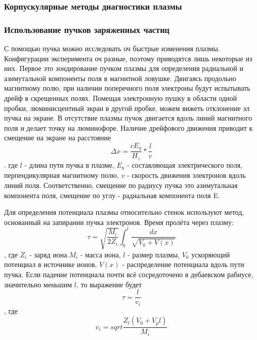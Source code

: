 \documentclass[10pt, a4paper]{article}
\begin{document}
\subsubsection{Корпускулярные методы диагностики плазмы}
\label{11.6}

\subsubsection{Использование пучков заряженных частиц}
\label{11.6.1}
С помощью пучка можно исследовать оч быстрые изменения плазмы. Конфигурации эксперимента оч разные, поэтому приводятся лишь некоторые из них.
Первое это зондирование пучком плазмы для определения радиальной и азимутальной компоненты поля в магнитной ловушке. Двигаясь продольно магнитному полю, при наличии поперечного поля электроны будут испытывать дрейф в скрещенных полях. Помещая электронную пушку в области одной пробки, люминисцентный экран в другой пробке, можем вижеть отклонение эл пучка на экране.
В отсутствие плазмы пучок двигается вдоль линий магнитного поля и делает точку на люминофоре. Наличие дрейфового движения приводит к смещение на экране на расстояние
\begin{equation}
	\Delta x=\frac{cE_y}{H_z} * \frac{l}{v}
\end{equation}
. где $l$ - длина пути пучка в плазме, $E_y$ - составляющая электрического поля, перпендикулярная магнитному полю, $v$ - скорость движения электронов вдоль линий поля.
Соответственно, смещение по радиусу пучка это азимутальная компонента поля, смещение по углу - радиальная компонента поля E.

Для определения потенциала плазмы относительно стенок используют метод, основанный на запирании пучка электронов. Время пролёта через плазму:
\begin{equation}
	\tau = \sqrt{\frac{M_i}{2Z_i}} \int_{0}^{l} \frac{dx}{\sqrt{V_0 +V(x)}}
\end{equation}
, где $Z_i$ - заряд иона.$M_i$ - масса иона, $l$ - размер плазмы, $V_0$ ускоряющий потенциал в источнике ионов, $V(x)$ - распределение потенциала вдоль пути пучка.
Если падение потенциала почти всё сосредоточено в дебаевском рабиусе, значительно меньшим $l$, то выражение будет
\begin{equation}
	\tau = \frac{l}{v_i}
\end{equation}
, где 
\begin{equation}
   v_i= sqrt{\frac{Z_l (V_0 + V_pl)}{M_i}}
\end{equation}
\end{document}
